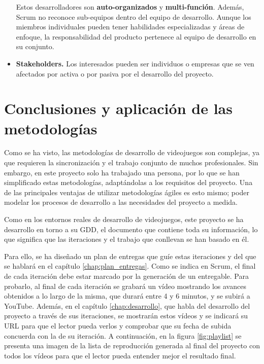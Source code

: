 \begin{itemize}
Estos desarrolladores son \textbf{auto-organizados} y \textbf{multi-función}. Además, Scrum no reconoce sub-equipos dentro del equipo de desarrollo. Aunque los miembros individuales pueden tener habilidades especializadas y áreas de enfoque, la responsabilidad del producto pertenece al equipo de desarrollo en su conjunto.

\item \textbf{Stakeholders.} Los interesados pueden ser individuos o empresas que se ven afectados por activa o por pasiva por el desarrollo del proyecto.

\end{itemize}

\section{Conclusiones y aplicación de las metodologías}

Como se ha visto, las metodologías de desarrollo de videojuegos son complejas, ya que requieren la sincronización y el trabajo conjunto de muchos profesionales. Sin embargo, en este proyecto solo ha trabajado una persona, por lo que se han simplificado estas metodologías, adaptándolas a los requisitos del proyecto. Una de las principales ventajas de utilizar metodologías ágiles es esto mismo; poder modelar los procesos de desarrollo a las necesidades del proyecto a medida. 

Como en los entornos reales de desarrollo de videojuegos, este proyecto se ha desarrollo en torno a su \acs{GDD}, el documento que contiene toda su información, lo que significa que las iteraciones y el trabajo que conllevan se han basado en él.

Para ello, se ha diseñado un plan de entregas que guíe estas iteraciones y del que se hablará en el capítulo \ref{chap:plan_entregas}. Como se indica en Scrum, el final de cada iteración debe estar marcado por la generación de un entregable. Para probarlo, al final de cada iteración se grabará un vídeo mostrando los avances obtenidos a lo largo de la misma, que durará entre 4 y 6 minutos, y se subirá a YouTube. Además, en el capítulo \ref{chap:desarrollo}, que habla del desarrollo del proyecto a través de sus iteraciones, se mostrarán estos vídeos y se indicará su URL para que el lector pueda verlos y comprobar que su fecha de subida concuerda con la de su iteración. A continuación,  en la figura \ref{fig:playlist} se presenta una imagen de la lista de reproducción generada al final del proyecto con todos los vídeos para que el lector pueda entender mejor el resultado final.

